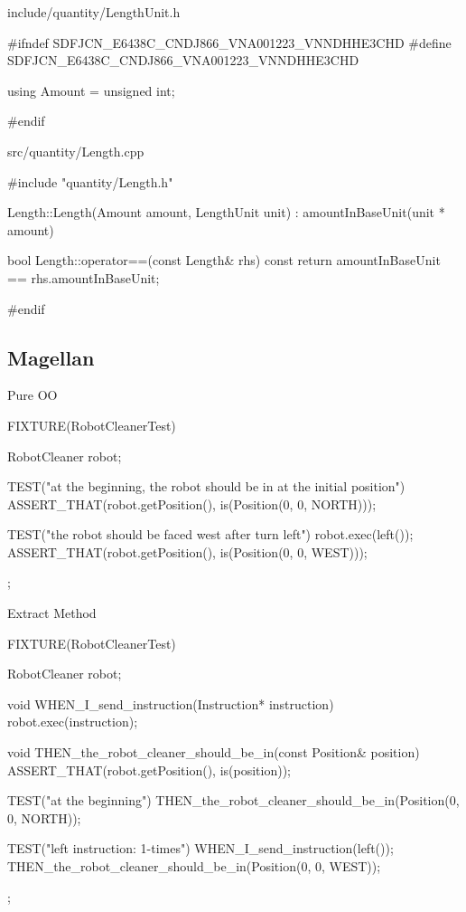 \begin{frame}[fragile]{include/quantity/LengthUnit.h}
\begin{c++}
#ifndef SDFJCN_E6438C_CNDJ866_VNA001223_VNNDHHE3CHD
#define SDFJCN_E6438C_CNDJ866_VNA001223_VNNDHHE3CHD

using Amount = unsigned int;

#endif
\end{c++}
\end{frame}

\begin{frame}[fragile]{src/quantity/Length.cpp}
\begin{c++}
#include "quantity/Length.h"

Length::Length(Amount amount, LengthUnit unit)
  : amountInBaseUnit(unit * amount)
{
}

bool Length::operator==(const Length& rhs) const
{
    return amountInBaseUnit == rhs.amountInBaseUnit;
}

#endif
\end{c++}
\end{frame}

\subsection{Magellan}

\begin{frame}[fragile]{Pure OO}
\begin{c++}
FIXTURE(RobotCleanerTest)
{
    RobotCleaner robot;

    TEST("at the beginning, the robot should be in at the initial position")
    {
        ASSERT_THAT(robot.getPosition(), is(Position(0, 0, NORTH)));
    }

    TEST("the robot should be faced west after turn left")
    {
        robot.exec(left());
        ASSERT_THAT(robot.getPosition(), is(Position(0, 0, WEST)));
    }
};
\end{c++}
\end{frame}

\begin{frame}[fragile]{Extract Method}
\begin{c++}
FIXTURE(RobotCleanerTest)
{
    RobotCleaner robot;

    void WHEN_I_send_instruction(Instruction* instruction)
    {
        robot.exec(instruction);
    }

    void THEN_the_robot_cleaner_should_be_in(const Position& position)
    {
        ASSERT_THAT(robot.getPosition(), is(position));
    }

    TEST("at the beginning")
    {
        THEN_the_robot_cleaner_should_be_in(Position(0, 0, NORTH));
    }

    TEST("left instruction: 1-times")
    {
        WHEN_I_send_instruction(left());
        THEN_the_robot_cleaner_should_be_in(Position(0, 0, WEST));
    }
};
\end{c++}
\end{frame}

